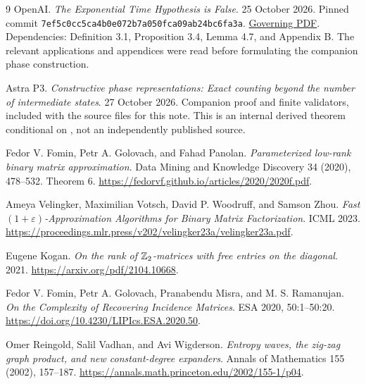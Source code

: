 \documentclass[11pt,a4paper]{article}
\theoremstyle{remark}\newtheorem{remark}[theorem]{Remark}
\begin{document}
\begin{thebibliography}{9}
OpenAI. \emph{The Exponential Time Hypothesis is False}.
25 October 2026. Pinned commit
\texttt{7ef5c0cc5ca4b0e072b7a050fca09ab24bc6fa3a}.
\href{https://github.com/openai/math/blob/7ef5c0cc5ca4b0e072b7a050fca09ab24bc6fa3a/preprints/The-Exponential-Time-Hypothesis-is-False-October-25-2026/paper.pdf}{Governing PDF}.
Dependencies: Definition 3.1, Proposition 3.4, Lemma 4.7,
and Appendix B. The relevant applications and appendices
were read before formulating the companion phase construction.

Astra P3. \emph{Constructive phase representations:
Exact counting beyond the number of intermediate states}.
27 October 2026. Companion proof and finite validators,
included with the source files for this note. This is an
internal derived theorem conditional on \cite{governing},
not an independently published source.

Fedor V. Fomin, Petr A. Golovach, and Fahad Panolan.
\emph{Parameterized low-rank binary matrix approximation}.
Data Mining and Knowledge Discovery 34 (2020), 478--532.
Theorem 6.
\url{https://fedorvf.github.io/articles/2020/2020f.pdf}.

Ameya Velingker, Maximilian Votsch, David P. Woodruff, and
Samson Zhou. \emph{Fast $(1+\varepsilon)$-Approximation
Algorithms for Binary Matrix Factorization}. ICML 2023.
\url{https://proceedings.mlr.press/v202/velingker23a/velingker23a.pdf}.

Eugene Kogan. \emph{On the rank of $\mathbb Z_2$-matrices with free
entries on the diagonal}. 2021.
\url{https://arxiv.org/pdf/2104.10668}.

Fedor V. Fomin, Petr A. Golovach, Pranabendu Misra, and
M. S. Ramanujan. \emph{On the Complexity of Recovering
Incidence Matrices}. ESA 2020, 50:1--50:20.
\url{https://doi.org/10.4230/LIPIcs.ESA.2020.50}.

Omer Reingold, Salil Vadhan, and Avi Wigderson.
\emph{Entropy waves, the zig-zag graph product, and new
constant-degree expanders}. Annals of Mathematics
155 (2002), 157--187.
\url{https://annals.math.princeton.edu/2002/155-1/p04}.
\end{thebibliography}
\end{document}

